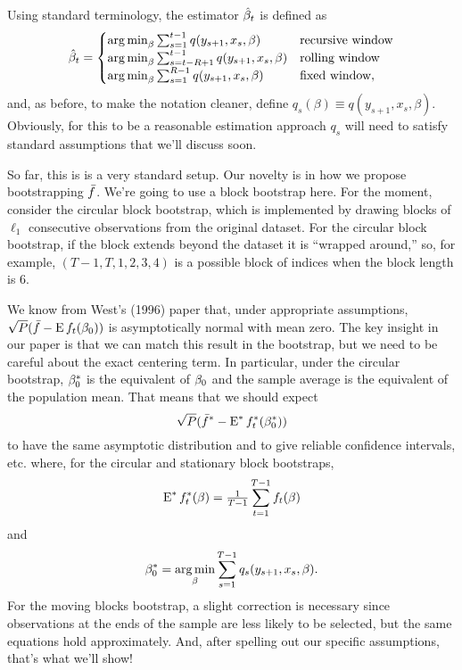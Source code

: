 \documentclass[12pt,fleqn]{article}
\begin{document}
Using standard terminology, the estimator $\hat \beta_t$ is defined as
\begin{equation}\label{eq:9}
  \hat\beta_t = \begin{cases}
    \operatorname*{arg\,min}_\beta \sum_{s=1}^{t-1} q(y_{s+1}, x_s, \beta) & \text{recursive window} \\
    \operatorname*{arg\,min}_\beta \sum_{s=t-R+1}^{t-1} q(y_{s+1}, x_s, \beta) & \text{rolling window} \\
    \operatorname*{arg\,min}_\beta \sum_{s=1}^{R-1} q(y_{s+1}, x_s, \beta) & \text{fixed window},
  \end{cases}
\end{equation}
and, as before, to make the notation cleaner, define $q_s(\beta)
\equiv q(y_{s+1},x_s,\beta)$. Obviously, for this to be a reasonable
estimation approach $q_s$ will need to satisfy standard assumptions
that we'll discuss soon.

So far, this is is a very standard setup. Our novelty is in how we
propose bootstrapping $\bar f$. We're going to use a block bootstrap
here. For the moment, consider the circular block bootstrap, which is
implemented by drawing blocks of $\ell_1$ consecutive observations
from the original dataset. For the circular block bootstrap, if the
block extends beyond the dataset it is ``wrapped around,'' so, for
example, $(T-1, T, 1, 2, 3, 4)$ is a possible block of indices when
the block length is 6.

We know from West's (1996) paper that, under appropriate assumptions,
$\sqrt{P} (\bar f - \operatorname{E} f_t(\beta_0))$ is asymptotically normal with mean
zero. The key insight in our paper is that we can match this result in
the bootstrap, but we need to be careful about the exact centering
term.  In particular, under the circular bootstrap, $\beta_0^*$ is the
equivalent of $\beta_0$ and the sample average is the equivalent of the
population mean. That means that we should expect
\begin{equation*}
  \sqrt{P} (\bar f^* - \operatorname{E}^* f_t^*(\beta_0^*))
\end{equation*}
to have the same asymptotic distribution and to give reliable
confidence intervals, etc. where, for the circular and stationary
block bootstraps,
\begin{equation*}
  \operatorname{E}^* f_t^*(\beta) = \tfrac{1}{T-1} \sum_{t=1}^{T-1} f_t(\beta)
\end{equation*}
and
\begin{equation*}
  \beta_0^* = \operatorname*{arg\,min}_\beta \sum_{s=1}^{T-1} q_s(y_{s+1}, x_s, \beta).
\end{equation*}
For the moving blocks bootstrap, a slight correction is necessary
since observations at the ends of the sample are less likely to be
selected, but the same equations hold approximately. And, after
spelling out our specific assumptions, that's what we'll show!
\end{document}
